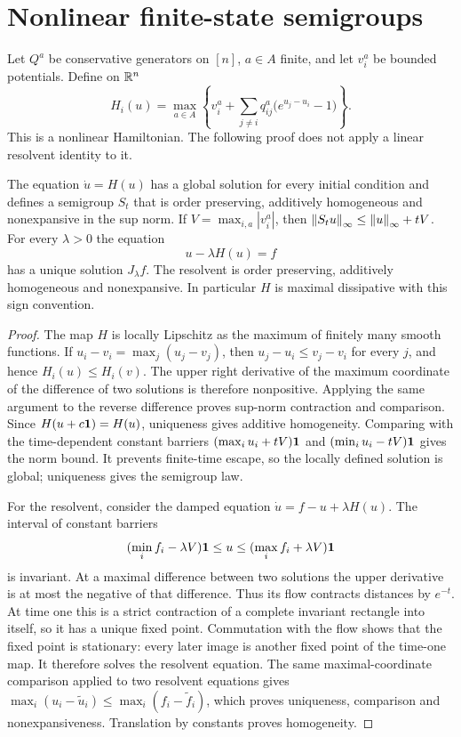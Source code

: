 \section{Nonlinear finite-state semigroups}
\label{sec:v10-nisio}

Let $Q^a$ be conservative generators on $[n]$, $a\in A$ finite, and
let $v_i^a$ be bounded potentials. Define on $\mathbb R^n$
\begin{equation}\label{eq:v10-nisio}
 H_i(u)=\max_{a\in A}
 \left\{v_i^a+\sum_{j\ne i}q_{ij}^a
                 \bigl(e^{u_j-u_i}-1\bigr)\right\}.
\end{equation}
This is a nonlinear Hamiltonian. The following proof does not apply
a linear resolvent identity to it.

\begin{theorem}
\label{thm:v10-nisio}
The equation $\dot u=H(u)$ has a global solution for every initial
condition and defines a semigroup $S_t$ that is order preserving,
additively homogeneous and nonexpansive in the sup norm. If
$V=\max_{i,a}|v_i^a|$, then
$\left\lVert S_tu\right\rVert_\infty\le\left\lVert u\right\rVert_\infty+tV$.
For every $\lambda>0$ the equation
\[
 u-\lambda H(u)=f
\]
has a unique solution $J_\lambda f$. The resolvent is order preserving,
additively homogeneous and nonexpansive. In particular $H$ is
maximal dissipative with this sign convention.
\end{theorem}
\begin{proof}
The map $H$ is locally Lipschitz as the maximum of finitely many
smooth functions. If $u_i-v_i=\max_j(u_j-v_j)$, then
$u_j-u_i\le v_j-v_i$ for every $j$, and hence $H_i(u)\le H_i(v)$.
The upper right derivative of the maximum coordinate of the
difference of two solutions is therefore nonpositive. Applying the
same argument to the reverse difference proves sup-norm contraction
and comparison. Since $H(u+c\mathbf 1)=H(u)$, uniqueness gives additive
homogeneity. Comparing with the time-dependent constant barriers
$(\max_i u_i+tV)\mathbf 1$ and $(\min_i u_i-tV)\mathbf 1$ gives the norm bound.
It prevents finite-time escape, so the locally defined solution is
global; uniqueness gives the semigroup law.

For the resolvent, consider the damped equation
$\dot u=f-u+\lambda H(u)$. The interval of constant barriers
\[
 (\min_i f_i-\lambda V)\mathbf 1\le u\le
 (\max_i f_i+\lambda V)\mathbf 1
\]
is invariant. At a maximal difference between two solutions the
upper derivative is at most the negative of that difference.
Thus its flow contracts distances by $e^{-t}$. At time one this is
a strict contraction of a complete invariant rectangle into itself,
so it has a unique fixed point. Commutation with the flow shows
that the fixed point is stationary: every later image is another
fixed point of the time-one map. It therefore solves the resolvent
equation. The same maximal-coordinate comparison applied to two
resolvent equations gives
$\max_i(u_i-\widetilde u_i)\le\max_i(f_i-\widetilde f_i)$,
which proves uniqueness, comparison and nonexpansiveness.
Translation by constants proves homogeneity.
\end{proof}

